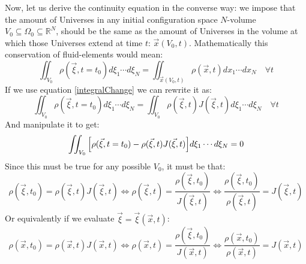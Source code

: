 \documentclass[11pt, a4paper]{article} %
\newcommand{\R}{\mathbb{R}} %
\begin{document}
Now, let us derive the continuity equation in the converse way: we impose that the amount of Universes in any initial configuration space $N$-volume $V_0\subseteq\Omega_0\subseteq\R^N$, should be the same as the amount of Universes in the volume at which those Universes extend at time $t$: $\vec{x}(V_0,t)$. Mathematically this conservation of fluid-elements would mean:
\begin{equation}
\iint_{V_0} \rho(\vec{\xi},t=t_0) d\xi_1\cdots d\xi_N=\iint_{\vec{x}(V_0,t)} \rho(\vec{x},t) dx_1\cdots dx_N\quad \forall t
\end{equation}
If we use equation \eqref{integralChange} we can rewrite it as:
\begin{equation}
\iint_{V_0} \rho(\vec{\xi},t=t_0) d\xi_1\cdots d\xi_N=\iint_{V_0} \rho(\vec{\xi},t) J(\vec{\xi},t) d\xi_1\cdots d\xi_N \quad \forall t
\end{equation}
And manipulate it to get:
\begin{equation}
\iint_{V_0} \qty[ \rho(\vec{\xi},t=t_0) -\rho(\vec{\xi},t) J(\vec{\xi},t) ]d\xi_1\cdots d\xi_N=0
\end{equation}
Since this must be true for any possible $V_0$, it must be that:
\begin{equation}
\rho(\vec{\xi},t_0) = \rho(\vec{\xi},t) J(\vec{\xi},t)\Longleftrightarrow \rho(\vec{\xi},t)=\frac{\rho(\vec{\xi},t_0)}{J(\vec{\xi},t)}\Longleftrightarrow \frac{\rho(\vec{\xi},t_0)}{\rho(\vec{\xi},t)}=J(\vec{\xi},t)
\end{equation}
Or equivalently if we evaluate $\vec{\xi}=\vec{\xi}(\vec{x},t)$:
\begin{equation}
\rho(\vec{x},t_0) = \rho(\vec{x},t) J(\vec{x},t)\Longleftrightarrow \rho(\vec{x},t)=\frac{\rho(\vec{\xi},t_0)}{J(\vec{x},t)}\Longleftrightarrow \frac{\rho(\vec{x},t_0)}{\rho(\vec{x},t)}=J(\vec{x},t)
\end{equation}
\end{document}
